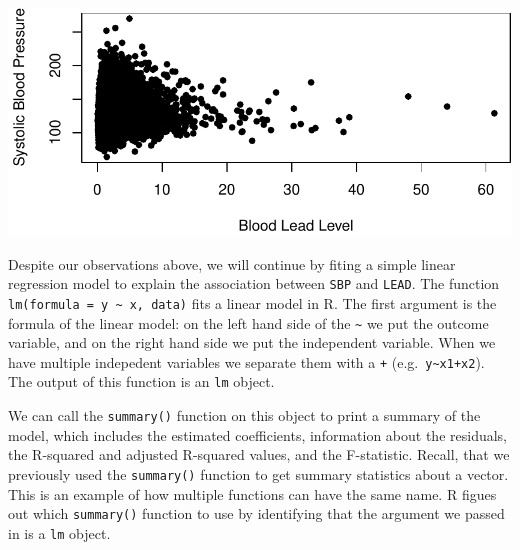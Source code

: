 \documentclass[
  letterpaper,
]{krantz}
\begin{document}
\begin{center}
\includegraphics[width=1\textwidth,height=\textheight]{book/linear_regression_files/figure-pdf/unnamed-chunk-4-1.pdf}
\end{center}

Despite our observations above, we will continue by fiting a simple
linear regression model to explain the association between \texttt{SBP}
and \texttt{LEAD}. The function
\texttt{lm(formula\ =\ y\ \textasciitilde{}\ x,\ data)} fits a linear
model in R. The first argument is the formula of the linear model: on
the left hand side of the \texttt{\textasciitilde{}} we put the outcome
variable, and on the right hand side we put the independent variable.
When we have multiple indepedent variables we separate them with a
\texttt{+} (e.g.~\texttt{y\textasciitilde{}x1+x2}). The output of this
function is an \texttt{lm} object.

We can call the \texttt{summary()} function on this object to print a
summary of the model, which includes the estimated coefficients,
information about the residuals, the R-squared and adjusted R-squared
values, and the F-statistic. Recall, that we previously used the
\texttt{summary()} function to get summary statistics about a vector.
This is an example of how multiple functions can have the same name. R
figues out which \texttt{summary()} function to use by identifying that
the argument we passed in is a \texttt{lm} object.
\end{document}

